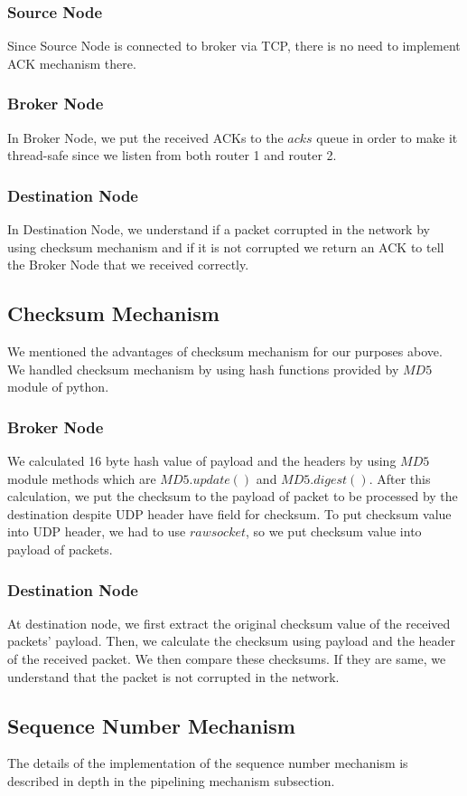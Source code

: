 \documentclass[conference]{IEEEtran}
\begin{document}
\subsubsection{Source Node}
Since Source Node is connected to broker via TCP, there is no need to implement ACK mechanism there.
\subsubsection{Broker Node}
In Broker Node, we put the received ACKs to the $acks$ queue in order to make it thread-safe since we listen from both router 1 and router 2. 
\subsubsection{Destination Node}
In Destination Node, we understand if a packet corrupted in the network by using checksum mechanism and if it is not corrupted we return an ACK to tell the Broker Node that we received correctly.
\subsection{Checksum Mechanism}
We mentioned the advantages of checksum mechanism for our purposes above. We handled checksum mechanism by using hash functions provided by $MD5$ module of python.
\subsubsection{Broker Node}
We calculated 16 byte hash value of payload and the headers by using $MD5$ module methods which are $MD5.update()$ and $MD5.digest()$. After this calculation, we put the checksum to the payload of packet to be processed by the destination despite UDP header have field for checksum. To put checksum value into UDP header,  we had to use $rawsocket$, so we put checksum value into payload of packets. 
\subsubsection{Destination Node}
At destination node, we first extract the original checksum value of the received packets' payload. Then, we calculate the checksum using payload and the header of the received packet. We then compare these checksums. If they are same, we understand that the packet is not corrupted in the network.
\subsection{Sequence Number Mechanism}
The details of the implementation of the sequence number mechanism is described in depth in the pipelining mechanism subsection.
\end{document}

